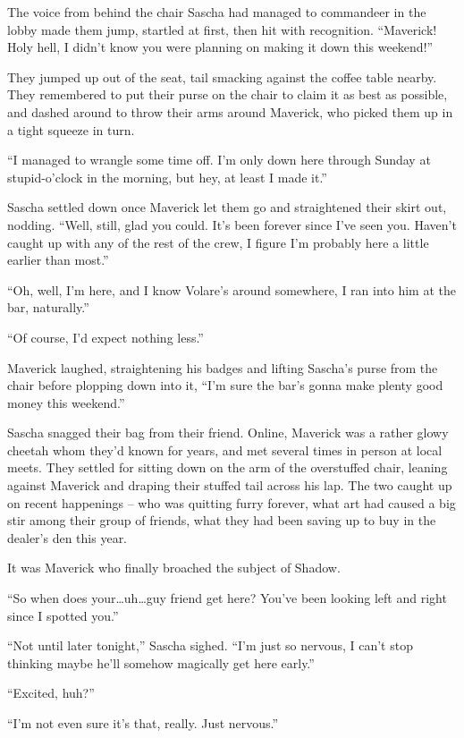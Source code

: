 The voice from behind the chair Sascha had managed to commandeer in the lobby made them jump, startled at first, then hit with recognition. ``Maverick! Holy hell, I didn't know you were planning on making it down this weekend!''

They jumped up out of the seat, tail smacking against the coffee table nearby. They remembered to put their purse on the chair to claim it as best as possible, and dashed around to throw their arms around Maverick, who picked them up in a tight squeeze in turn.

``I managed to wrangle some time off. I'm only down here through Sunday at stupid-o'clock in the morning, but hey, at least I made it.''

Sascha settled down once Maverick let them go and straightened their skirt out, nodding. ``Well, still, glad you could. It's been forever since I've seen you. Haven't caught up with any of the rest of the crew, I figure I'm probably here a little earlier than most.''

``Oh, well, I'm here, and I know Volare's around somewhere, I ran into him at the bar, naturally.''

``Of course, I'd expect nothing less.''

Maverick laughed, straightening his badges and lifting Sascha's purse from the chair before plopping down into it, ``I'm sure the bar's gonna make plenty good money this weekend.''

Sascha snagged their bag from their friend. Online, Maverick was a rather glowy cheetah whom they'd known for years, and met several times in person at local meets. They settled for sitting down on the arm of the overstuffed chair, leaning against Maverick and draping their stuffed tail across his lap. The two caught up on recent happenings -- who was quitting furry forever, what art had caused a big stir among their group of friends, what they had been saving up to buy in the dealer's den this year.

It was Maverick who finally broached the subject of Shadow.

``So when does your\ldots{}uh\ldots{}guy friend get here? You've been looking left and right since I spotted you.''

``Not until later tonight,'' Sascha sighed. ``I'm just so nervous, I can't stop thinking maybe he'll somehow magically get here early.''

``Excited, huh?''

``I'm not even sure it's that, really. Just nervous.''

